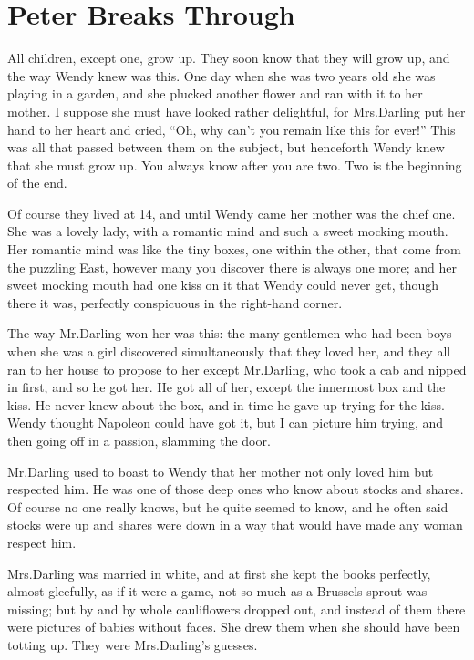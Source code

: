 
\chapter{Peter Breaks Through}

All children, except one, grow up.
They soon know that they will grow up,
and the way Wendy knew was this.
One day when she was two years old she was playing in a garden,
and she plucked another flower and ran with it to her mother.
I suppose she must have looked rather delightful,
for Mrs.\@ Darling put her hand to her heart and cried,
“Oh, why can’t you remain like this for ever!”
This was all that passed between them on the subject,
but henceforth Wendy knew that she must grow up.
You always know after you are two.
Two is the beginning of the end.

Of course they lived at 14,
and until Wendy came her mother was the chief one.
She was a lovely lady, with a romantic mind and such a sweet mocking mouth.
Her romantic mind was like the tiny boxes, one within the other, that come from the puzzling East,
however many you discover there is always one more;
and her sweet mocking mouth had one kiss on it that Wendy could never get,
though there it was, perfectly conspicuous in the right-hand corner.

The way Mr.\@ Darling won her was this:
the many gentlemen who had been boys when she was a girl discovered simultaneously that they loved her,
and they all ran to her house to propose to her
except Mr.\@ Darling, who took a cab and nipped in first, and so he got her.
He got all of her, except the innermost box and the kiss.
He never knew about the box, and in time he gave up trying for the kiss.
Wendy thought Napoleon could have got it,
but I can picture him trying, and then going off in a passion, slamming the door.

Mr.\@ Darling used to boast to Wendy that her mother not only loved him but respected him.
He was one of those deep ones who know about stocks and shares.
Of course no one really knows, but he quite seemed to know,
and he often said stocks were up and shares were down in a way that would have made any woman respect him.

Mrs.\@ Darling was married in white,
and at first she kept the books perfectly, almost gleefully, as if it were a game,
not so much as a Brussels sprout was missing;
but by and by whole cauliflowers dropped out,
and instead of them there were pictures of babies without faces.
She drew them when she should have been totting up.
They were Mrs.\@ Darling’s guesses.

